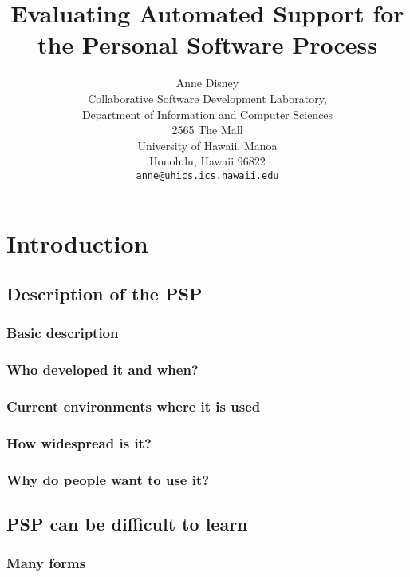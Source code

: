 



\title{Evaluating Automated Support for the Personal Software Process}
\author{Anne Disney\\
Collaborative Software Development Laboratory,\\
Department of Information and Computer Sciences\\
2565 The Mall\\
University of Hawaii, Manoa\\
Honolulu, Hawaii   96822\\
{\tt anne@uhics.ics.hawaii.edu}}
\maketitle

\tableofcontents
\chapter{Introduction}
\section{Description of the PSP}

\subsection{Basic description}
\subsection{Who developed it and when?}
\subsection{Current environments where it is used}
\subsection{How widespread is it?}
\subsection{Why do people want to use it?}
\section{PSP can be difficult to learn}
\subsection{Many forms}
